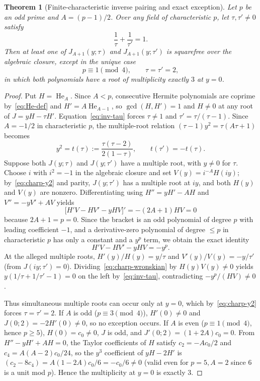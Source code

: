 \documentclass[11pt,reqno]{amsart}
\numberwithin{equation}{section}
\newtheorem{theorem}{Theorem}[section]
\theoremstyle{definition}
\theoremstyle{remark}
\newcommand{\He}{\operatorname{He}}
\begin{document}
\begin{theorem}[Finite-characteristic inverse pairing and exact exception]
\label{thm:charp-pair}
Let $p$ be an odd prime and $A=(p-1)/2$. Over any field of characteristic $p$, let $\tau,\tau'\neq 0$ satisfy
\begin{equation}
\label{eq:inv-tau}
\frac{1}{\tau} + \frac{1}{\tau'} = 1.
\end{equation}
Then at least one of $J_{A+1}(y;\tau)$ and $J_{A+1}(y;\tau')$ is squarefree over the algebraic closure, \emph{except} in the unique case
\begin{equation}
\label{eq:charp-exc}
p\equiv 1\pmod 4,\qquad \tau=\tau'=2,
\end{equation}
in which both polynomials have a root of multiplicity exactly $3$ at $y=0$.
\end{theorem}

\begin{proof}
Put $H=\He_A$. Since $A<p$, consecutive Hermite polynomials are coprime by~\eqref{eq:He-def} and $H'=A\He_{A-1}$, so $\gcd(H,H')=1$ and $H\neq 0$ at any root of $J=yH-\tau H'$. Equation~\eqref{eq:inv-tau} forces $\tau\neq 1$ and $\tau'=\tau/(\tau-1)$. Since $A=-1/2$ in characteristic $p$, the multiple-root relation $(\tau-1)y^2=\tau(A\tau+1)$ becomes
\begin{equation}
\label{eq:charp-y2}
y^2 = t(\tau) := \frac{\tau(\tau-2)}{2(1-\tau)},\qquad t(\tau') = -t(\tau).
\end{equation}
Suppose both $J(y;\tau)$ and $J(y;\tau')$ have a multiple root, with $y\neq 0$ for $\tau$. Choose $i$ with $i^2=-1$ in the algebraic closure and set $V(y)=i^{-A}H(iy)$; by~\eqref{eq:charp-y2} and parity, $J(y;\tau')$ has a multiple root at $iy$, and both $H(y)$ and $V(y)$ are nonzero. Differentiating using $H''=yH'-AH$ and $V''=-yV'+AV$ yields
\[
\bigl[H'V - HV' - yHV\bigr]' = -(2A+1)HV = 0
\]
because $2A+1=p=0$. Since the bracket is an odd polynomial of degree $p$ with leading coefficient $-1$, and a derivative-zero polynomial of degree $\le p$ in characteristic $p$ has only a constant and a $y^p$ term, we obtain the exact identity
\begin{equation}
\label{eq:charp-wronskian}
H'V - HV' - yHV = -y^p.
\end{equation}
At the alleged multiple roots, $H'(y)/H(y)=y/\tau$ and $V'(y)/V(y)=-y/\tau'$ (from $J(iy;\tau')=0$). Dividing~\eqref{eq:charp-wronskian} by $H(y)V(y)\neq 0$ yields $y(1/\tau + 1/\tau' - 1)=0$ on the left by~\eqref{eq:inv-tau}, contradicting $-y^p/(HV)\neq 0$.

Thus simultaneous multiple roots can occur only at $y=0$, which by~\eqref{eq:charp-y2} forces $\tau=\tau'=2$. If $A$ is odd ($p\equiv 3\pmod 4$), $H'(0)\neq 0$ and $J(0;2)=-2H'(0)\neq 0$, so no exception occurs. If $A$ is even ($p\equiv 1\pmod 4$, hence $p\ge 5$), $H(0)=c_0\neq 0$, $J$ is odd, and $J'(0;2)=(1+2A)c_0=0$. From $H''-yH'+AH=0$, the Taylor coefficients of $H$ satisfy $c_2=-Ac_0/2$ and $c_4=A(A-2)c_0/24$, so the $y^3$ coefficient of $yH-2H'$ is $(c_2-8c_4)=A(1-2A)c_0/6 = -c_0/6\neq 0$ (valid even for $p=5,A=2$ since $6$ is a unit mod $p$). Hence the multiplicity at $y=0$ is exactly $3$.
\end{proof}
\end{document}
